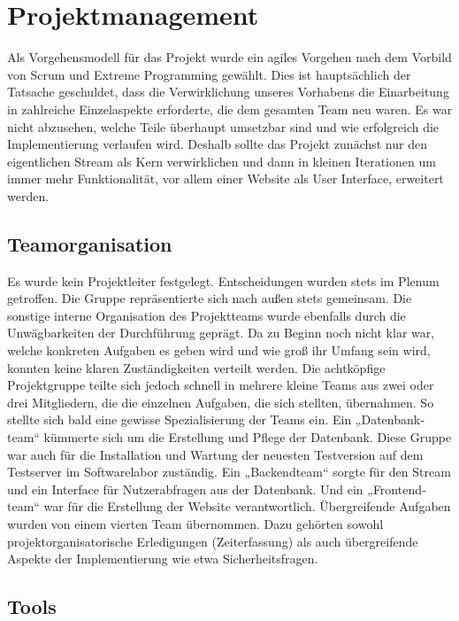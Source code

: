 \chapter{Projektmanagement}

Als Vorgehensmodell für das Projekt wurde ein agiles Vorgehen nach dem Vorbild von Scrum und
Extreme Programming gewählt. Dies ist hauptsächlich der Tatsache geschuldet, dass die
Verwirklichung unseres Vorhabens die Einarbeitung in zahlreiche Einzelaspekte erforderte, die
dem gesamten Team neu waren. Es war nicht abzusehen, welche Teile überhaupt umsetzbar sind
und wie erfolgreich die Implementierung verlaufen wird. Deshalb sollte das Projekt zunächst nur
den eigentlichen Stream als Kern verwirklichen und dann in kleinen Iterationen um immer mehr
Funktionalität, vor allem einer Website als User Interface, erweitert werden.

\section{Teamorganisation}
Es wurde kein Projektleiter festgelegt. Entscheidungen wurden stets im Plenum getroffen. Die
Gruppe repräsentierte sich nach außen stets gemeinsam.
Die sonstige interne Organisation des Projektteams wurde ebenfalls durch die Unwägbarkeiten der
Durchführung geprägt. Da zu Beginn noch nicht klar war, welche konkreten Aufgaben es geben
wird und wie groß ihr Umfang sein wird, konnten keine klaren Zuständigkeiten verteilt werden.
Die achtköpfige Projektgruppe teilte sich jedoch schnell in mehrere kleine Teams aus zwei oder
drei Mitgliedern, die die einzelnen Aufgaben, die sich stellten, übernahmen. So stellte sich bald
eine gewisse Spezialisierung der Teams ein. Ein „Datenbank­team“ kümmerte sich um die
Erstellung und Pflege der Datenbank. Diese Gruppe war auch für die Installation und Wartung der
neuesten Testversion auf dem Testserver im Softwarelabor zuständig. Ein „Backend­team“ sorgte
für den Stream und ein Interface für Nutzerabfragen aus der Datenbank. Und ein „Frontend­team“
war für die Erstellung der Website verantwortlich. Übergreifende Aufgaben wurden von einem
vierten Team übernommen. Dazu gehörten sowohl projektorganisatorische Erledigungen
(Zeiterfassung) als auch übergreifende Aspekte der Implementierung wie etwa Sicherheitsfragen.

\section{Tools}

